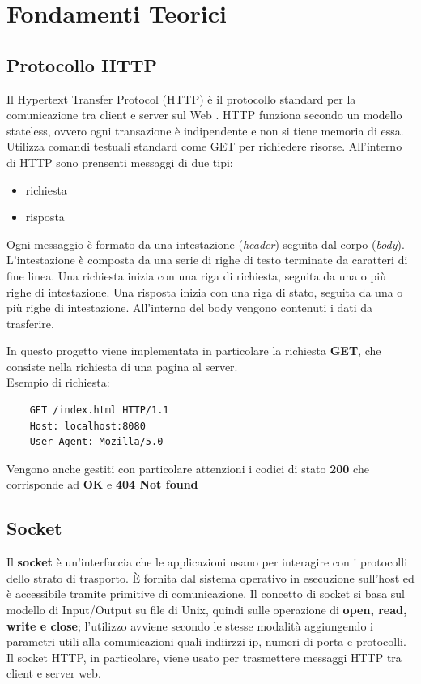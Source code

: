 \documentclass[a4paper,12pt]{report}
\begin{document}
\chapter{Fondamenti Teorici}
\section{Protocollo HTTP}
Il Hypertext Transfer Protocol (HTTP) è il protocollo standard per la comunicazione tra client e server sul Web . HTTP funziona secondo
un modello stateless, ovvero ogni transazione è indipendente e non si tiene memoria di essa. Utilizza comandi testuali standard come 
GET per richiedere risorse. All'interno di HTTP sono prensenti messaggi di due tipi:
\begin{itemize}
    \item richiesta
    \item risposta
\end{itemize}
Ogni messaggio è formato da una intestazione (\emph{header}) seguita dal corpo (\emph{body}). L'intestazione è composta da una serie di righe di testo
terminate da caratteri di fine linea. Una richiesta inizia con una riga di richiesta, seguita da una o più righe di intestazione. Una 
risposta inizia con una riga di stato, seguita da una o più righe di intestazione. All'interno del body vengono contenuti i dati da 
trasferire. 

In questo progetto viene implementata in particolare la richiesta \textbf{GET}, che consiste nella richiesta di una pagina al server. \\Esempio di 
richiesta:
\begin{verbatim}
    GET /index.html HTTP/1.1
    Host: localhost:8080
    User-Agent: Mozilla/5.0
\end{verbatim}
    
Vengono anche gestiti con particolare attenzioni i codici di stato \textbf{200} che corrisponde ad \textbf{OK} e \textbf{404 Not found}
\section{Socket}
Il \textbf{socket} è un'interfaccia che le applicazioni usano per interagire con i protocolli dello strato di trasporto. 
È fornita dal sistema operativo in esecuzione sull'host ed è accessibile tramite primitive di comunicazione. Il concetto di socket si basa
sul modello di Input/Output su file di Unix, quindi sulle operazione di \textbf{open, read, write e close}; l’utilizzo avviene secondo le stesse 
modalità aggiungendo i parametri utili alla comunicazioni quali indiirzzi ip, numeri di porta e protocolli. 
Il socket HTTP, in particolare, viene usato per trasmettere messaggi HTTP tra client e server web.
\end{document}
